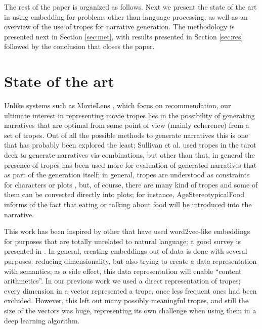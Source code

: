 \documentclass[letterpaper]{article}
\begin{document}
	
	
	

	The rest of the paper is organized as follows. Next we present the
	state of the art in using embedding for problems other than language
	processing, as well as an overview of the use of tropes for narrative
	generation. The methodology is presented next in Section
	\ref{sec:met}, with results presented in Section \ref{sec:res}
	followed by the conclusion that closes the paper.
	
	
	\section{State of the art}
	
	Unlike systems such as MovieLens \cite{10.1145/2827872}, which focus
	on recommendation, our ultimate
	interest in representing movie tropes lies in the possibility of
	generating narratives \cite{10.5555/931357} that are optimal from some point of view (mainly
	coherence) from a set of tropes. Out of all the possible methods to
	generate narratives \cite{van2019narrative} this is one that has
	probably been explored the least; Sullivan et
	al. \cite{10.1145/3235765.3235819} used tropes in the tarot deck to
	generate narratives via combinations, but other than that, in general
	the presence of tropes has been used more for evaluation of generated
	narratives \cite{gervas2012story} that as part of the generation
	itself; in general, tropes are understood as constraints for
	characters or plots \cite{Thompson18NarrativeEvents}, but, of course,
	there are many kind of tropes and some of them can be converted
	directly into plots; for instance, {\sf AgeStereotypicalFood} informs
	of the fact that eating or talking about food will be introduced into
	the narrative.
	
	This work has been inspired by other that have used
	word2vec-like embeddings for purposes that are totally
	unrelated to natural language; a good survey is presented in
	\cite{nonnlp19}. In general, creating embeddings out of data
	is done with several purposes: reducing dimensionality, but
	also trying to create a data representation with semantics; as
	a side effect, this data representation will enable ``content
	arithmetics''. In our previous work
	\cite{doi:10.1111/exsy.12525} we used a direct representation
	of tropes; every dimension in a vector represented a trope,
	once less frequent ones had been excluded. However, this left
	out many possibly meaningful tropes, and still the size of the
	vectors was huge, representing its own challenge when using
	them in a deep learning algorithm.
	
\end{document}
